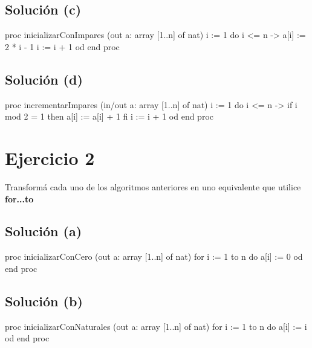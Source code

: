 \documentclass{article}
\begin{document}
\subsection{Solución (c)}
\begin{codebox}
\begin{pascallike}
proc inicializarConImpares (out a: array [1..n] of nat)
    i := 1
    do i <= n -> 
    a[i] := 2 * i - 1
    i := i + 1
    od
end proc
\end{pascallike}
\end{codebox}

\subsection{Solución (d)}
\begin{codebox}
\begin{pascallike}
proc incrementarImpares (in/out a: array [1..n] of nat)
    i := 1
    do i <= n -> 
    if i mod 2 = 1 then
        a[i] := a[i] + 1
    fi
    i := i + 1
    od
end proc
\end{pascallike}
\end{codebox}

\section{Ejercicio 2}
Transformá cada uno de los algoritmos anteriores en uno equivalente que utilice \textbf{for...to} 

\subsection{Solución (a)}
\begin{codebox}
\begin{pascallike}
proc inicializarConCero (out a: array [1..n] of nat)
    for i := 1 to n do
    a[i] := 0
    od
end proc
\end{pascallike}
\end{codebox}

\subsection{Solución (b)}
\begin{codebox}
\begin{pascallike}
proc inicializarConNaturales (out a: array [1..n] of nat)
    for i := 1 to n do
    a[i] := i
    od
end proc
\end{pascallike}
\end{codebox}
\end{document}
